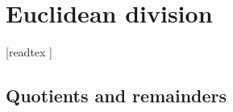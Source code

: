\documentclass[../arithmetic.tex]{subfiles}
\begin{document}
  \chapter{Euclidean division}\label{chapter:euclidean-division}


  \begin{forthel}

    [readtex ]

  \end{forthel}


  \section{Quotients and remainders}
\end{document}
